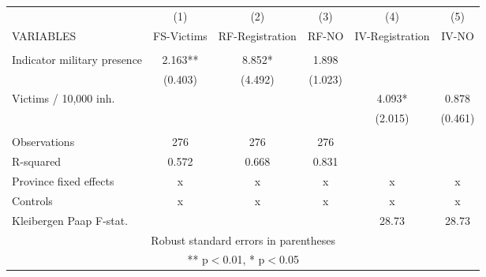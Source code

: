 \begin{tabular}{lccccc} \hline
 & (1) & (2) & (3) & (4) & (5) \\
VARIABLES & FS-Victims & RF-Registration & RF-NO & IV-Registration & IV-NO \\ \hline
 &  &  &  &  &  \\
Indicator military presence & 2.163** & 8.852* & 1.898 &  &  \\
 & (0.403) & (4.492) & (1.023) &  &  \\
Victims / 10,000 inh. &  &  &  & 4.093* & 0.878 \\
 &  &  &  & (2.015) & (0.461) \\
 &  &  &  &  &  \\
Observations & 276 & 276 & 276 &  &  \\
R-squared & 0.572 & 0.668 & 0.831 &  &  \\
Province fixed effects & x & x & x & x & x \\
Controls & x & x & x & x & x \\
 Kleibergen Paap F-stat. &  &  &  & 28.73 & 28.73 \\ \hline
\multicolumn{6}{c}{ Robust standard errors in parentheses} \\
\multicolumn{6}{c}{ ** p$<$0.01, * p$<$0.05} \\
\end{tabular}
